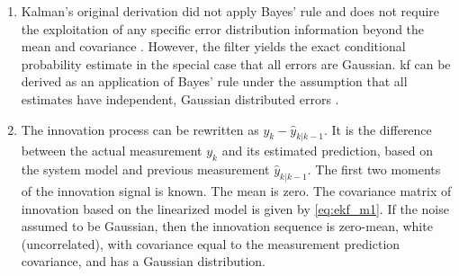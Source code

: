 \documentclass[12pt]{article}
\begin{document}
\begin{enumerate}[label=\arabic*)]
\begin{figure}[!ht]
            \caption{\acrshort{ekf} block diagram. Time-update and measurement-update blocks are represented by blue and red dashed rectangular.} \label{fig:ekf}
        \end{figure}
        
        The measurement variable directly influences the estimated state mean $\hat{x}_{k|k}$ and maximum covariance $P_{k|k}$, therefore all variables are dependent of the measurement recursively, except the measurement noise $v_k$ and process noise $w_k$.
        
        The system will be independent of measurement in case of high measurement noise covariance $V_k$. In this case Kalman gain $K_k$ goes to zero, and the estimated state will depend on predicted state $\hat{x}_{k|k}$ only. It is obvious that a measurement with high uncertainty is not valuable and \acrshort{kf} reduces the weight of the measured (observed) value in consequence.
        
        
    \item
        Kalman's original derivation did not apply Bayes' rule and does not require the exploitation of any specific error distribution information beyond the mean and covariance \cite{kalman1960new}. However, the filter yields the exact conditional probability estimate in the special case that all errors are Gaussian. \acrshort{kf} can be derived as an application of Bayes' rule under the assumption that all estimates have independent, Gaussian distributed errors \cite{julier2004unscented}. 
        
        
    \item
        The innovation process can be rewritten as $y_k - \hat{y}_{k|k-1}$. It is the difference between the actual measurement $y_k$ and its estimated prediction, based on the system model and previous measurement $\hat{y}_{k|k-1}$.
        The first two moments of the innovation signal is known. The mean is zero. The covariance matrix of innovation based on the linearized model is given by \eqref{eq:ekf_m1}.
        If the noise assumed to be Gaussian, then the innovation sequence is zero-mean, white (uncorrelated), with covariance equal to the measurement prediction covariance, and has a Gaussian distribution. 
\end{enumerate}
\end{document}
